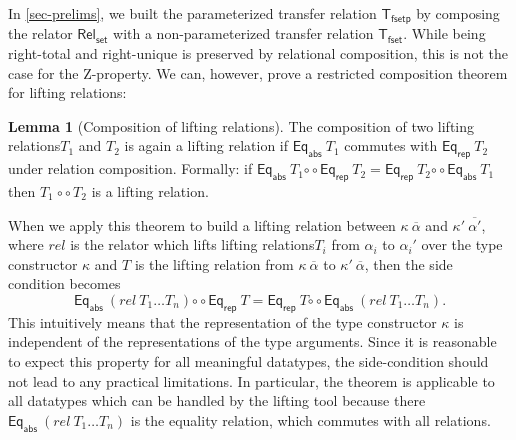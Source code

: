 \documentclass{article}
\theoremstyle{definition}
\newtheorem{lemma}[definition]{Lemma}
\newcommand{\relcomp}{\mathbin{\circ\circ}}
\newcommand{\eqrep}{\mathsf{Eq_{rep}}}
\newcommand{\eqabs}{\mathsf{Eq_{abs}}}
\newcommand{\liftrel}{lifting relation\xspace}
\newcommand{\liftrels}{lifting relations\xspace}
\begin{document}
In \cref{sec-prelims},
we built the parameterized transfer relation \(\mathsf{T_{fset p}}\) by composing the relator \(\mathsf{Rel_{set}}\) with a non-parameterized transfer relation \(\mathsf{T_{fset}}\).
While being right-total and right-unique is preserved by relational composition,
this is not the case for the Z-property.
We can, however, prove a restricted composition theorem for \liftrels:
\begin{lemma}[Composition of \liftrels]\label{comp-of-trans-rels}
	The composition of two \liftrels \(T_1\) and \(T_2\) is again a \liftrel if \(\eqabs\ T_1\) commutes with \( \eqrep\ T_2 \) under relation composition.
	Formally: if \(\eqabs\ T_1 \relcomp \eqrep\ T_2 = \eqrep\ T_2 \relcomp \eqabs\ T_1\) then \(T_1 \ \relcomp T_2\) is a \liftrel.
\end{lemma}

When we apply this theorem to build a \liftrel between
\(\kappa\ \overline{\alpha}\) and \(\kappa'\ \overline{\alpha'}\),
where \(rel\) is the relator which lifts \liftrels \(T_i\) from \(\alpha_i\) to \(\alpha_i'\) over the type constructor \(\kappa\) and \(T\) is the \liftrel from \(\kappa\ \overline{\alpha}\) to \(\kappa'\ \overline{\alpha}\),
then the side condition becomes
\begin{equation*}
	\eqabs\ (rel\ T_1 \ldots T_n) \relcomp \eqrep\ T = \eqrep\ T \relcomp \eqabs\ (rel\ T_1 \ldots T_n).
\end{equation*}
This intuitively means that the representation of the type constructor
\(\kappa\) is independent of the representations of the type arguments.
Since it is reasonable to expect this property for all meaningful datatypes, the side-condition should not lead to any practical limitations. In particular, the theorem is applicable to all datatypes which can be handled by the lifting tool
because there \(\eqabs\ (rel\ T_1 \ldots T_n)\) is the equality relation,
which commutes with all relations.
\newline
\end{document}

